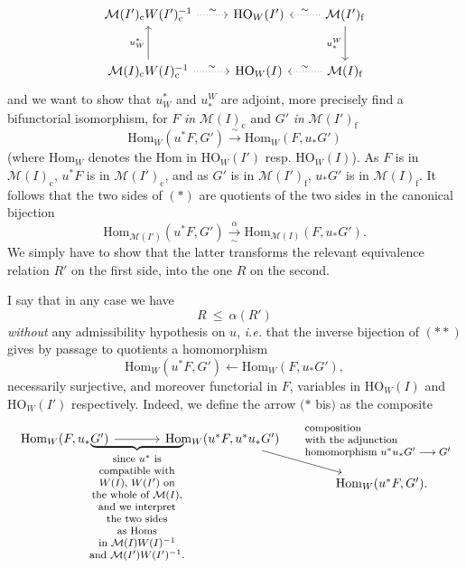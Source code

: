 \documentclass[11pt]{article}
\newcommand{\printedpage}[1]{\marginpar{\footnotesize p.~#1}}
\newcommand{\msp}[1]{\marginpar{\footnotesize [#1]}}
\newcommand{\cM}{\mathcal{M}}
\newcommand{\HO}{\mathrm{HO}}
\newcommand{\Hom}{\mathrm{Hom}}
\newcommand{\rf}{\mathrm{f}}
\newcommand{\rc}{\mathrm{c}}
\begin{document}
\printedpage{38}
\msp{page 68}
\[
\begin{tikzcd}[row sep=large]
\cM(I')_{\rc}W(I')_{\rc}^{-1} \arrow[r, dotted, "\sim"] & \HO_W(I') & \cM(I')_{\rf} \arrow[l, dotted, "\sim"'] \arrow[d, "u_*^W"'] \\
\cM(I)_{\rc}W(I)_{\rc}^{-1} \arrow[r, dotted, "\sim"] \arrow[u, "u_W^*"] & \HO_W(I) & \cM(I)_{\rf} \arrow[l, dotted, "\sim"']
\end{tikzcd}
\]
 and we want to show that $u_W^*$ and $u_*^W$ are adjoint, more precisely find a bifunctorial isomorphism, for $F$ \textit{in} $\cM(I)_{\rc}$ and $G'$ \textit{in} $\cM(I')_{\rf}$
\[
\Hom_W(u^*F, G') \xrightarrow{\ \sim\ } \Hom_W(F, u_*G') \tag*{$(*)$}
\]
(where $\Hom_W$ denotes the Hom in $\HO_W(I')$ resp. $\HO_W(I)$). As $F$ is in $\cM(I)_{\rc}$, $u^*F$ is in $\cM(I')_{\rc}$, and as $G'$ is in $\cM(I')_{\rf}$, $u_*G'$ is in $\cM(I)_{\rf}$. It follows that the two sides of $(*)$ are quotients of the two sides in the canonical bijection
\[
\Hom_{\cM(I')}(u^*F, G') \xrightarrow[\ \sim\ ]{\alpha} \Hom_{\cM(I)}(F, u_*G'). \tag*{$(**)$}
\]
We simply have to show that the latter transforms the relevant equivalence relation $R'$ on the first side,
\msp{page 69}
into the one $R$ on the second.

I say that in any case we have
\[
R \ \leq \ \alpha(R')
\]
\textit{without} any admissibility hypothesis on $u$, \textit{i.e.} that the inverse bijection of $(**)$ gives by passage to quotients a homomorphism %
\[
\Hom_W(u^*F, G') \longleftarrow \Hom_W(F, u_*G'), \tag*{$(***)$}
\]
necessarily surjective, and moreover functorial in $F$, variables in $\HO_W(I)$ and $\HO_W(I')$ respectively. Indeed, we define the arrow $(*$ bis$)$ as the composite
\[
\begin{tikzcd}[column sep=large]
\Hom_W(F, u_*G') \arrow[r, "\underbrace{\hspace{2.6cm}}_{\text{\footnotesize\begin{tabular}{@{}c@{}}since $u^*$ is\\ compatible with\\ $W(I)$, $W(I')$ on\\ the whole of $\cM(I)$,\\ and we interpret\\ the two sides\\ as Homs\\ in $\cM(I)W(I)^{-1}$\\ and $\cM(I')W(I')^{-1}$.\end{tabular}}}"'] & \Hom_W(u^*F, u^*u_*G') \arrow[dr, "\text{\footnotesize\begin{tabular}{@{}l@{}}composition\\ with the adjunction\\ homomorphism $u^*u_*G' \longrightarrow G'$\end{tabular}}"] & \\
 & & \Hom_W(u^*F, G').
\end{tikzcd}
\]
\end{document}
